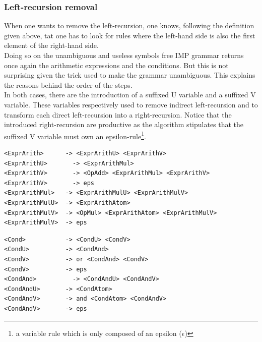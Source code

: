 \documentclass[a4paper,11pt]{article}
\begin{document}
    \subsubsection{Left-recursion removal}
      When one wants to remove the left-recursion, one knows, following the definition given above, tat one has to look for rules where the left-hand side is also the first element of the right-hand side.\\
      Doing so on the unambiguous and useless symbols free IMP grammar returns once again the arithmetic expressions and the conditions. But this is not surprising given the trick used to make the grammar unambiguous. This explains the reasons behind the order of the steps.\\
      In both cases, there are the introduction of a suffixed U variable and a suffixed V variable. These variables respectively used to remove indirect left-recursion and to transform each direct left-recursion into a right-recursion. Notice that the introduced right-recursion are productive as the algorithm stipulates that the suffixed V variable must own an epsilon-rule\footnote{\label{epsilonrule}a variable rule which is only composed of an epsilon ($\epsilon$)}.
      \begin{lstlisting}
<ExprArith>	     -> <ExprArithU> <ExprArithV>
<ExprArithU>	   -> <ExprArithMul>
<ExprArithV>	   -> <OpAdd> <ExprArithMul> <ExprArithV> 
<ExprArithV>	   -> eps
<ExprArithMul>	 -> <ExprArithMulU> <ExprArithMulV>
<ExprArithMulU>	 -> <ExprArithAtom> 
<ExprArithMulV>	 -> <OpMul> <ExprArithAtom> <ExprArithMulV> 
<ExprArithMulV>	 -> eps\end{lstlisting}
      \begin{lstlisting} 
<Cond>	         -> <CondU> <CondV>
<CondU>	         -> <CondAnd> 
<CondV>	         -> or <CondAnd> <CondV> 
<CondV>	         -> eps
<CondAnd>	       -> <CondAndU> <CondAndV>
<CondAndU>	     -> <CondAtom> 
<CondAndV>	     -> and <CondAtom> <CondAndV> 
<CondAndV>	     -> eps\end{lstlisting}
\end{document}
